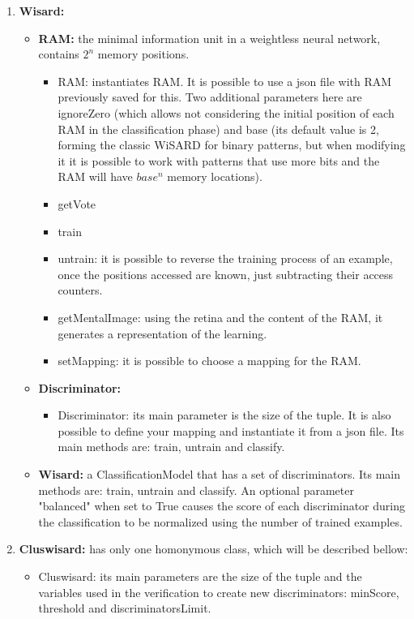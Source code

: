 \documentclass[12pt]{article}
\begin{document}
\begin{enumerate}
    \item \textbf{Wisard:}
    \begin{itemize}
        \item \textbf{RAM:} the minimal information unit in a weightless neural network, contains $2^{n}$ memory positions. 
        \begin{itemize}
            \item RAM: instantiates RAM. It is possible to use a json file with RAM previously saved for this. Two additional parameters here are ignoreZero (which allows not considering the initial position of each RAM in the classification phase) and base (its default value is 2, forming the classic WiSARD for binary patterns, but when modifying it it is possible to work with patterns that use more bits and the RAM will have $base^{n}$ memory locations).
            \item getVote
            \item train
            \item untrain: it is possible to reverse the training process of an example, once the positions accessed are known, just subtracting their access counters.
            \item getMentalImage: using the retina and the content of the RAM, it generates a representation of the learning.
            \item setMapping: it is possible to choose a mapping for the RAM.
        \end{itemize}
        \item \textbf{Discriminator:}
        \begin{itemize}
            \item Discriminator: its main parameter is the size of the tuple. It is also possible to define your mapping and instantiate it from a json file. Its main methods are: train, untrain and classify.
        \end{itemize}
        \item \textbf{Wisard:} a ClassificationModel that has a set of discriminators. Its main methods are: train, untrain and classify. An optional parameter "balanced" when set to True causes the score of each discriminator during the classification to be normalized using the number of trained examples.
    \end{itemize}
    \item \textbf{Cluswisard:} has only one homonymous class, which will be described bellow:
    \begin{itemize}
        \item Cluswisard: its main parameters are the size of the tuple and the variables used in the verification to create new discriminators: minScore, threshold and discriminatorsLimit.

\end{itemize}
\end{enumerate}
\end{document}
